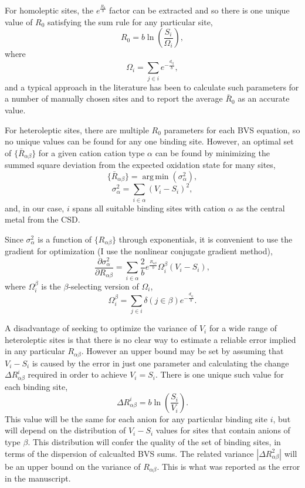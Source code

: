\documentclass{article}
\DeclareMathOperator*{\argmin}{arg\,min}
\begin{document}
For homoleptic sites, the $e^{\frac{R_{0}}{b}}$ factor can be extracted and so there is one unique value of $R_0$ satisfying the sum rule for any particular site,
$$ R_0 = b \ln \left( \frac{S_i}{\Omega_i} \right),$$
where
$$\Omega_i = \sum_{j \in i}e^{-\frac{d_{ij}}{b}},$$
and a typical approach in the literature has been to calculate such parameters for a number of manually chosen sites and to report the average $\bar{R}_0$ as an accurate value.

For heteroleptic sites, there are multiple $R_0$ parameters for each BVS equation, so no unique values can be found for any one binding site. However, an optimal set of $\lbrace \bar{R}_{\alpha\beta} \rbrace$ for a given cation cation type $\alpha$ can be found by minimizing the summed square deviation from the expected oxidation state for many sites,
$$\lbrace \bar{R}_{\alpha\beta} \rbrace = \argmin \left( \sigma^2_{\alpha} \right),$$
$$\sigma^2_{\alpha} = \sum_{i \in \alpha} \left(V_i-S_i\right)^2,$$
and, in our case, $i$ spans all suitable binding sites with cation $\alpha$ as the central metal from the CSD.

Since $\sigma^2_{\alpha}$ is a function of $\lbrace R_{\alpha\beta} \rbrace$ through exponentials, it is convenient to use the gradient for optimization (I use the nonlinear conjugate gradient method),
$$\frac{\partial \sigma^2_{\alpha}}{\partial R_{\alpha\beta}} = \sum_{i \in \alpha} \frac{2}{b} e^{\frac{R_{\alpha\beta}}{b}} \Omega_i^\beta \left(V_i-S_i\right),$$
where $\Omega_i^\beta$ is the $\beta$-selecting version of $\Omega_i$,
$$\Omega_i^\beta = \sum_{j \in i} \delta\left(j \in \beta\right) e^{-\frac{d_{ij}}{b}}.$$

A disadvantage of seeking to optimize the variance of $V_i$ for a wide range of heteroleptic sites is that there is no clear way to estimate a reliable error implied in any particular $R_{\alpha\beta}$. However an upper bound may be set by assuming that $V_i-S_i$ is caused by the error in just one parameter and calculating the change $\Delta R^i_{\alpha\beta}$ required in order to achieve $V_i=S_i$. There is one unique such value for each binding site,
$$ \Delta R^i_{\alpha\beta} = b\ln\left( \frac{S_i}{V_i} \right).$$
This value will be the same for each anion for any particular binding site $i$, but will depend on the distribution of $V_i-S_i$ values for sites that contain anions of type $\beta$. This distribution will confer the quality of the set of binding sites, in terms of the dispersion of calcualted BVS sums. The related variance $\left| \Delta R^2_{\alpha\beta} \right|$ will be an upper bound on the variance of $R_{\alpha\beta}$. This is what was reported as the error in the manuscript.
\end{document}
